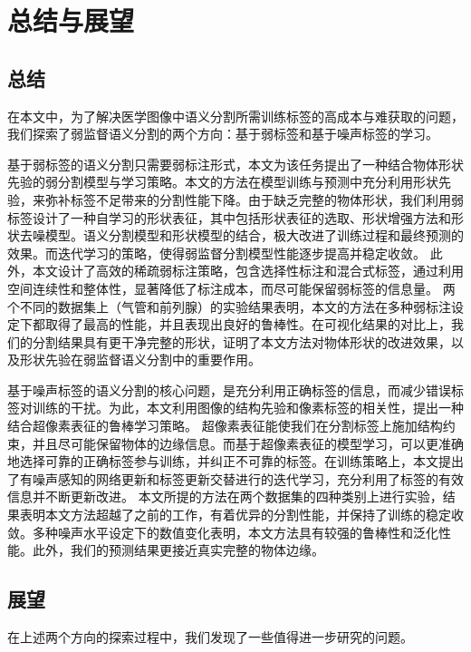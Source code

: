 \chapter{总结与展望}

\section{总结}
在本文中，为了解决医学图像中语义分割所需训练标签的高成本与难获取的问题，我们探索了弱监督语义分割的两个方向：基于弱标签和基于噪声标签的学习。

基于弱标签的语义分割只需要弱标注形式，本文为该任务提出了一种结合物体形状先验的弱分割模型与学习策略。本文的方法在模型训练与预测中充分利用形状先验，来弥补标签不足带来的分割性能下降。由于缺乏完整的物体形状，我们利用弱标签设计了一种自学习的形状表征，其中包括形状表征的选取、形状增强方法和形状去噪模型。语义分割模型和形状模型的结合，极大改进了训练过程和最终预测的效果。而迭代学习的策略，使得弱监督分割模型性能逐步提高并稳定收敛。
此外，本文设计了高效的稀疏弱标注策略，包含选择性标注和混合式标签，通过利用空间连续性和整体性，显著降低了标注成本，而尽可能保留弱标签的信息量。
两个不同的数据集上（气管和前列腺）的实验结果表明，本文的方法在多种弱标注设定下都取得了最高的性能，并且表现出良好的鲁棒性。在可视化结果的对比上，我们的分割结果具有更干净完整的形状，证明了本文方法对物体形状的改进效果，以及形状先验在弱监督语义分割中的重要作用。

基于噪声标签的语义分割的核心问题，是充分利用正确标签的信息，而减少错误标签对训练的干扰。为此，本文利用图像的结构先验和像素标签的相关性，提出一种结合超像素表征的鲁棒学习策略。
超像素表征能使我们在分割标签上施加结构约束，并且尽可能保留物体的边缘信息。而基于超像素表征的模型学习，可以更准确地选择可靠的正确标签参与训练，并纠正不可靠的标签。在训练策略上，本文提出了有噪声感知的网络更新和标签更新交替进行的迭代学习，充分利用了标签的有效信息并不断更新改进。
本文所提的方法在两个数据集的四种类别上进行实验，结果表明本文方法超越了之前的工作，有着优异的分割性能，并保持了训练的稳定收敛。多种噪声水平设定下的数值变化表明，本文方法具有较强的鲁棒性和泛化性能。此外，我们的预测结果更接近真实完整的物体边缘。

\section{展望}
在上述两个方向的探索过程中，我们发现了一些值得进一步研究的问题。

